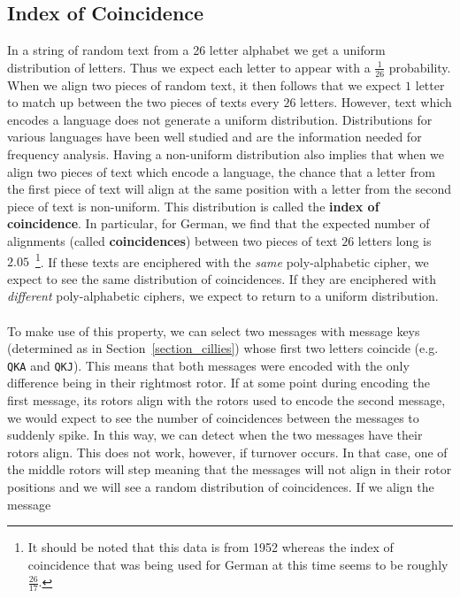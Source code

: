 \subsection{Index of Coincidence}\label{ioc}
In a string of random text from a 26 letter alphabet we get a uniform
distribution of letters. Thus we expect each letter to appear with a
$\frac{1}{26}$ probability. When we align two pieces of random text,
it then follows that we expect $1$ letter to match up between the two
pieces of texts
every $26$ letters. However, text which encodes a language does
not generate a uniform distribution. Distributions for various
languages have been well studied and are the information needed for
frequency analysis. Having a non-uniform distribution also implies
that when we align two pieces of text which encode a language, the
chance that a letter from the first piece of text will align at the
same position with a letter
from the second piece of text is non-uniform. This distribution is
called the {\bf{index of coincidence}}. In particular, for German, we
find that the expected number of alignments (called
{\bf{coincidences}}) between two pieces of text $26$ letters long is
$2.05$~\cite[p.~5-3]{FriedmanCallimahos1952}\footnote{It should be noted that this data is from 1952 whereas the index of coincidence that was being used for German at this time seems to be roughly $\frac{26}{17}$.}. If these texts
are enciphered with the \emph{same} poly-alphabetic cipher, we expect
to see the same distribution of coincidences. If they are enciphered
with \emph{different} poly-alphabetic ciphers, we expect to return to
a uniform distribution.
\\\\To make use of this property, we can select two messages with
message keys (determined as in Section~\ref{section_cillies}) whose first two
letters coincide (e.g. \texttt{QKA} and
\texttt{QKJ}). This means that both messages were encoded with the
only difference being in their rightmost rotor. If at some point
during encoding the first message, its rotors align with the rotors
used to encode the second message, we would expect to see the number
of coincidences between the messages to suddenly spike.
In this way, we can detect when the two messages have their rotors
align. This does not work, however, if turnover occurs. In that case,
one of the middle rotors will step meaning that the
messages will not align in their rotor positions and we will see a
random distribution of coincidences. If we align the message
